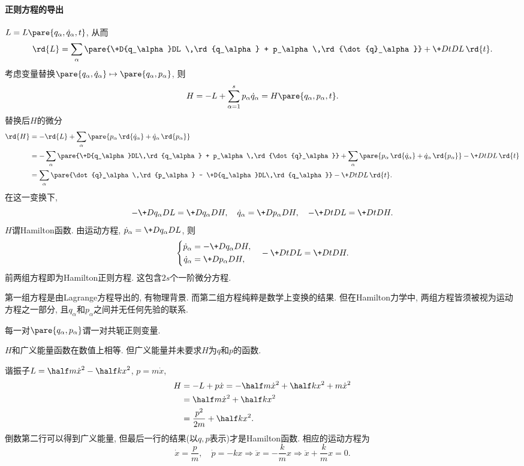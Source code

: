 \documentclass{ctexart}
\begin{document}

\paragraph{正则方程的导出} %
\label{par:正则方程的导出}

$L = L\pare{q_\alpha,\dot{q}_\alpha,t}$, 从而
\[ \rd{L} = \sum_\alpha \pare{\+D{q_\alpha}DL \,\rd{q_\alpha} + p_\alpha\,\rd{\dot{q}_\alpha}} + \+DtDL\,\rd{t}. \]
考虑变量替换$\pare{q_\alpha,\dot{q}_\alpha}\mapsto \pare{q_\alpha,p_\alpha}$, 则
\[ H = -L + \sum_{\alpha=1}^s p_\alpha \dot{q}_\alpha = H\pare{q_\alpha,p_\alpha,t}. \]
替换后$H$的微分
\begin{align*}
    \rd{H} &= -\rd{L} + \sum_\alpha\pare{p_\alpha \,\rd{\dot{q}_\alpha} + \dot{q}_\alpha\,\rd{p_\alpha}} \\
    &= -\sum_\alpha \pare{\+D{q_\alpha}DL\,\rd{q_\alpha} + p_\alpha\,\rd{\dot{q}_\alpha}} + \sum_\alpha \pare{p_\alpha\,\rd{\dot{q}_\alpha} + \dot{q}_\alpha\,\rd{p_\alpha}} - \+DtDL\,\rd{t} \\
    &= \sum_\alpha \pare{\dot{q}_\alpha \,\rd{p_\alpha} - \+D{q_\alpha}DL\,\rd{q_\alpha}} - \+DtDL\,\rd{t}.
\end{align*}
在这一变换下,
\[ -\+D{q_\alpha}DL = \+D{q_\alpha}DH,\quad \dot{q}_\alpha = \+D{p_\alpha}DH,\quad -\+DtDL = \+DtDH. \]
$H$谓Hamilton函数. 由运动方程, $\dot{p}_\alpha = \displaystyle \+D{q_\alpha}DL$, 则
\[ \left\{ \begin{aligned}
    \dot{p}_\alpha &= -\+D{q_\alpha}DH, \\
    \dot{q}_\alpha &= \+D{p_\alpha}DH,
\end{aligned} \right.\quad -\+DtDL = \+DtDH. \]
前两组方程即为Hamilton正则方程. 这包含$2s$个一阶微分方程.
\begin{remark}
    第一组方程是由Lagrange方程导出的, 有物理背景. 而第二组方程纯粹是数学上变换的结果. 但在Hamilton力学中, 两组方程皆须被视为运动方程之一部分, 且$q_\alpha$和$p_\alpha$之间并无任何先验的联系.
\end{remark}
每一对$\pare{q_\alpha,p_\alpha}$谓一对共轭正则变量.
\begin{remark}
    $H$和广义能量函数在数值上相等. 但广义能量并未要求$H$为$q$和$p$的函数.
\end{remark}
\begin{ex}
    谐振子$\displaystyle L = \half m\dot{x}^2 - \half kx^2$, $\displaystyle p = m\dot{x}$,
    \begin{align*}
        H &= -L + p\dot{x} = -\half m\dot{x}^2 + \half kx^2 + m\dot{x}^2 \\
        &= \half m\dot{x}^2 + \half kx^2 \\
        &= \frac{p^2}{2m} + \half kx^2.
    \end{align*}
    倒数第二行可以得到广义能量, 但最后一行的结果(以$q,p$表示)才是Hamilton函数. 相应的运动方程为
    \[ \dot{x} = \frac{p}{m},\quad \dot{p} = -kx\Rightarrow \ddot{x} = -\frac{k}{m}x \Rightarrow \ddot{x} + \frac{k}{m}x = 0. \]
\end{ex}
\end{document}
